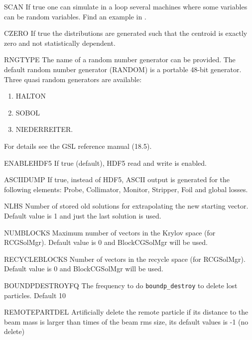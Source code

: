 \begin{kdescription}
  \item[SCAN]
  If true one can simulate in a loop several machines where some variables can be random variables. Find an
  example in .

  \item[CZERO]
  If true the distributions are generated such that the centroid is exactly zero and not statistically dependent.

  \item[RNGTYPE]
  The name  of a random number generator can be provided. The default random number generator (RANDOM) is a portable 48-bit generator. Three quasi random generators are available:
  \begin{enumerate}
    \item HALTON
    \item SOBOL
    \item NIEDERREITER.
  \end{enumerate}
  For details see the GSL reference manual (18.5).

  \item[ENABLEHDF5]
  If true (default), HDF5 read and write is enabled.

  \item[ASCIIDUMP]
  If true, instead of HDF5, ASCII output is generated for the following elements: Probe, Collimator, Monitor, Stripper, Foil and global losses.

  \item[NLHS]
  Number of stored old solutions for extrapolating the new starting vector. Default value is 1 and just the last solution is used.

  \item[NUMBLOCKS]
  Maximum number of vectors in the Krylov space (for RCGSolMgr). Default value is 0 and BlockCGSolMgr will be used.

  \item[RECYCLEBLOCKS]
  Number of vectors in the recycle space (for RCGSolMgr). Default value is 0 and BlockCGSolMgr will be used.

  \item[BOUNDPDESTROYFQ]
  The frequency to do \texttt{boundp\_destroy} to delete lost particles. Default 10

  \item[REMOTEPARTDEL]
  Artificially delete the remote particle if its distance to the beam mass is larger than  times of the beam rms size, its default values is -1 (no delete)


\end{kdescription}
